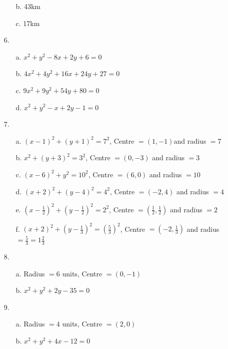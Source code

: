 \begin{enumerate}[leftmargin=*, widest=19]
\begin{enumerate}
  \item[b.] 43km
  \item[c.] 17km
\end{enumerate}
\item[6.]
\begin{enumerate}
  \item[a.] $x^2 + y^2 - 8x + 2y + 6 = 0$
  \item[b.] $4x^2 + 4y^2 + 16x + 24y + 27 = 0$
  \item[c.] $9x^2 + 9y^2 + 54y + 80 = 0$
  \item[d.] $x^2 + y^2 - x + 2y - 1 = 0$
\end{enumerate}
\item[7.]
\begin{enumerate}
  \item[a.] $(x - 1)^2 + (y + 1)^2 = 7^2$, Centre $= (1, -1)$and radius $= 7$
  \item[b.] $x^2 + (y + 3)^2 = 3^2$, Centre $= (0, -3)$ and radius $= 3$
  \item[c.] $(x - 6)^2 + y^2 = 10^2$, Centre $= (6, 0)$ and radius $= 10$
  \item[d.] $(x + 2)^2 + (y - 4)^2 = 4^2$, Centre $= (-2, 4)$ and radius $= 4$
  \item[e.] $\left(x - \frac{1}{2}\right)^2 + \left(y - \frac{1}{2}\right)^2 = 2^2$, Centre $= \left(\frac{1}{2}, \frac{1}{2}\right)$ and radius $= 2$
  \item[f.] $\left(x + 2\right)^2 + \left(y - \frac{1}{3}\right)^2 = \left(\frac{5}{3}\right)^2$, Centre $= \left(-2, \frac{1}{3}\right)$ and radius
  $= \frac{5}{3} = 1\frac{2}{3}$
\end{enumerate}
\item[8.]
\begin{enumerate}
  \item[a.] Radius $= 6$ units, Centre $= (0, -1)$
  \item[b.] $x^2 + y^2 + 2y - 35 = 0$
\end{enumerate}
\item[9.]
\begin{enumerate}
  \item[a.] Radius $= 4$ units, Centre $= (2, 0)$
  \item[b.] $x^2 + y^2 + 4x - 12 = 0$

\end{enumerate}
\end{enumerate}
